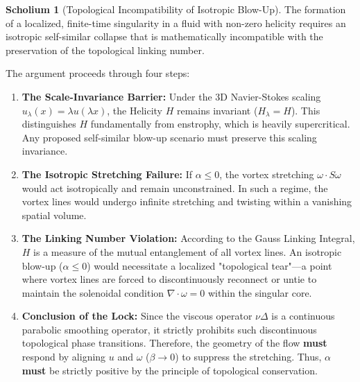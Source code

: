 \documentclass[12pt,a4paper]{article}
\theoremstyle{plain}
\theoremstyle{definition}
\newtheorem{scholium}[theorem]{Scholium}
\theoremstyle{remark}
\begin{document}
\begin{scholium}[Topological Incompatibility of Isotropic Blow-Up]
The formation of a localized, finite-time singularity in a fluid with non-zero helicity requires an isotropic self-similar collapse that is mathematically incompatible with the preservation of the topological linking number.
\end{scholium}

The argument proceeds through four steps:
\begin{enumerate}[label=(\roman*)]
    \item \textbf{The Scale-Invariance Barrier:} Under the 3D Navier-Stokes scaling $u_\lambda(x) = \lambda u(\lambda x)$, the Helicity $H$ remains invariant ($H_\lambda = H$). This distinguishes $H$ fundamentally from enstrophy, which is heavily supercritical. Any proposed self-similar blow-up scenario must preserve this scaling invariance.
    \item \textbf{The Isotropic Stretching Failure:} If $\alpha \leq 0$, the vortex stretching $\omega \cdot S \omega$ would act isotropically and remain unconstrained. In such a regime, the vortex lines would undergo infinite stretching and twisting within a vanishing spatial volume.
    \item \textbf{The Linking Number Violation:} According to the Gauss Linking Integral, $H$ is a measure of the mutual entanglement of all vortex lines. An isotropic blow-up ($\alpha \leq 0$) would necessitate a localized "topological tear"—a point where vortex lines are forced to discontinuously reconnect or untie to maintain the solenoidal condition $\nabla \cdot \omega = 0$ within the singular core.
    \item \textbf{Conclusion of the Lock:} Since the viscous operator $\nu \Delta$ is a continuous parabolic smoothing operator, it strictly prohibits such discontinuous topological phase transitions. Therefore, the geometry of the flow \textbf{must} respond by aligning $u$ and $\omega$ ($\beta \to 0$) to suppress the stretching. Thus, $\alpha$ \textbf{must} be strictly positive by the principle of topological conservation.
\end{enumerate}
\end{document}
